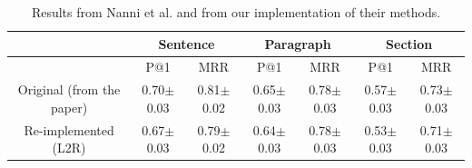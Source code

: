 \begin{table}[t]
\caption{Results from Nanni et al.\cite{nanni2018entity} and from our implementation of their methods.}
\label{tab:Reproducible-results}
\begin{tabular}{ccccccc}
\toprule
                          & \multicolumn{2}{c}{Sentence} & \multicolumn{2}{c}{Paragraph} & \multicolumn{2}{c}{Section}  \\ \hline
                          & P@1           & MRR           & P@1            & MRR           & P@1           & MRR           \\
\midrule
Original (from the paper) & 0.70$\pm$0.03 & 0.81$\pm$0.02 & 0.65$\pm$0.03  & 0.78$\pm$0.03 & 0.57$\pm$0.03 & 0.73$\pm$0.03 \\ 
Re-implemented (L2R)      & 0.67$\pm$0.03 & 0.79$\pm$0.02 & 0.64$\pm$0.03  & 0.78$\pm$0.03 & 0.53$\pm$0.03 & 0.71$\pm$0.03 \\ 
\bottomrule
\end{tabular}
\end{table}

